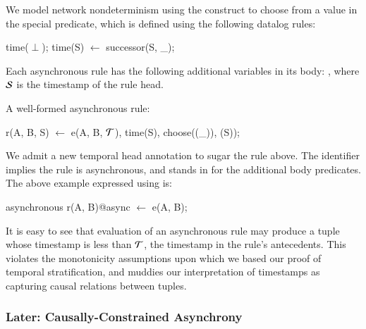 We model network nondeterminism using the  construct to choose
from a value in the special 
predicate, which is defined using the following datalog rules:

\begin{Dedalus}
time(\(\perp\));
time(S) \(\leftarrow\) successor(S, _);
\end{Dedalus}


Each asynchronous rule has the following additional variables in its
body: , where
$\SDedalus$ is the timestamp of the rule head.

\begin{example}
A well-formed asynchronous \lang rule:

\begin{Dedalus}
r(A, B, S) \(\leftarrow\) 
  e(A, B, \(\Tau\)),
  time(S), choose((_)), (S));
\end{Dedalus}
\end{example}

We admit a new temporal head annotation to sugar the rule above.  The
identifier  implies the rule is asynchronous, and stands in for the additional body predicates.
The above example expressed using  is:

\begin{Dedalus}
asynchronous
r(A, B)@async \(\leftarrow\) e(A, B);
\end{Dedalus}

It is easy to see that evaluation of an asynchronous rule may produce a tuple whose timestamp is less than $\Tau$, the timestamp
in the rule's antecedents. 
This violates the monotonicity assumptions upon which we based our proof of temporal stratification, and muddies our interpretation
of timestamps as capturing causal relations between tuples.


\subsubsection{Later: Causally-Constrained Asynchrony}

